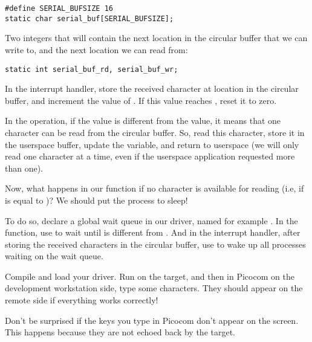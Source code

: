 \begin{verbatim}
#define SERIAL_BUFSIZE 16
static char serial_buf[SERIAL_BUFSIZE];
\end{verbatim}

Two integers that will contain the next location in the circular
buffer that we can write to, and the next location we can read from:

\begin{verbatim}
static int serial_buf_rd, serial_buf_wr;
\end{verbatim}

In the interrupt handler, store the received character at location
 in the circular buffer, and increment the value
of . If this value reaches ,
reset it to zero.

In the  operation, if the  value is
different from the  value, it means that one
character can be read from the circular buffer. So, read this
character, store it in the userspace buffer, update the
 variable, and return to userspace (we will only
read one character at a time, even if the userspace application
requested more than one).

Now, what happens in our  function if no character is
available for reading (i.e, if  is equal to
)? We should put the process to sleep!

To do so, declare a global wait queue in our driver, named for example
. In the  function, use
 to wait until 
is different from . And in the interrupt handler,
after storing the received characters in the circular buffer, use
 to wake up all processes waiting on the wait queue.

Compile and load your driver. Run  on the
target, and then in Picocom on the development workstation side, type
some characters. They should appear on the remote side if everything
works correctly!

Don't be surprised if the keys you type in Picocom don't appear on the
screen. This happens because they are not echoed back by the target.

